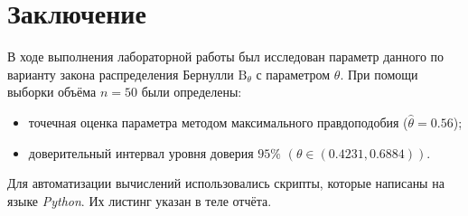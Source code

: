 \section{Заключение}

В ходе выполнения лабораторной работы был исследован параметр данного по варианту закона распределения Бернулли \( \textrm{B}_\theta \) с параметром \( \theta \). При помощи выборки объёма \( n=50 \) были определены:
\begin{itemize}
    \item точечная оценка параметра методом максимального правдоподобия \mbox{($\hat{\theta}= 0.56$)};
    \item доверительный интервал уровня доверия \( 95\% \) \( (\theta\in(0.4231,0.6884)) \).
\end{itemize}

Для автоматизации вычислений использовались скрипты, которые написаны на языке \textit{Python}. Их листинг указан в теле отчёта.